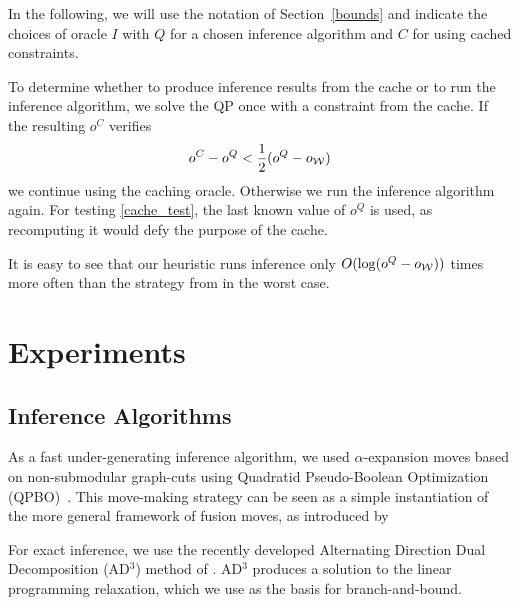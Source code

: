 In the following, we will use the notation of Section~\ref{bounds} and indicate
the choices of oracle $I$ with $Q$ for a chosen inference algorithm and $C$ for
using cached constraints.

To determine whether to produce inference results from the cache or to run the inference algorithm,
we solve the QP once with a constraint from the cache. If the resulting $o^C$ verifies
\begin{equation}\label{eq:cache_test}
    o^C - o^Q < \frac{1}{2} (o^Q - o_{\mathcal{W}})
\end{equation}
we continue using the caching oracle. Otherwise we run the inference algorithm again.
For testing \eqref{cache_test}, the last known value of $o^Q$ is used, as recomputing it would defy
the purpose of the cache.

It is easy to see that our heuristic runs inference only $O(\log(o^Q -
o_{\mathcal{W}}))$ times more often than the strategy from \citet{joachims2009cutting} in the
worst case.



\section{Experiments}
\subsection{Inference Algorithms}
As a fast under-generating inference algorithm, we used $\alpha$-expansion
moves based on non-submodular graph-cuts using Quadratid Pseudo-Boolean
Optimization (QPBO)~\citep{rother2007optimizing}.  This move-making strategy
can be seen as a simple instantiation of the more general framework of fusion
moves, as introduced by \citet{lempitsky2010fusion}

For exact inference, we use the recently developed Alternating Direction Dual
Decomposition (AD$^3$) method of \citet{martins2011augmented}. AD$^3$ produces
a solution to the linear programming relaxation, which we use as the basis for
branch-and-bound.

